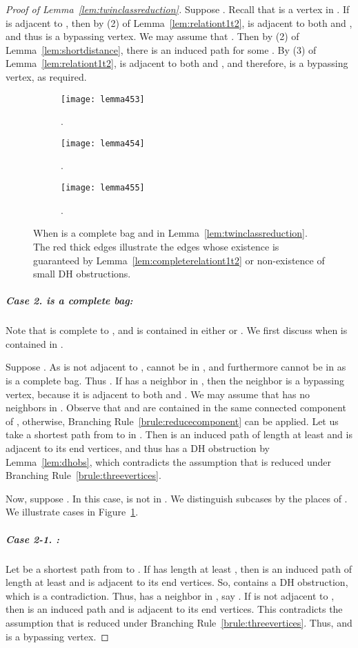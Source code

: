 \documentclass[11pt]{elsarticle}
\begin{document}
\begin{proof}[Proof of Lemma~\ref{lem:twinclassreduction}]
Suppose . Recall that  is a vertex in . If  is adjacent to , then by (2) of Lemma~\ref{lem:relationt1t2},
 is adjacent to both  and , and thus  is a bypassing vertex.
We may assume that .
Then by (2) of Lemma~\ref{lem:shortdistance}, there is an induced path  for some .
By (3) of Lemma~\ref{lem:relationt1t2},  is adjacent to both  and , and therefore,  is a bypassing vertex, as required.


  \begin{figure}[t]
\begin{subfigure}[b]{0.5\textwidth}
      \texttt{[image: lemma453]}
       \caption{.}
\end{subfigure}
\qquad
\begin{subfigure}[b]{0.5\textwidth}
      \texttt{[image: lemma454]}
       \caption{.}
\end{subfigure}
\center
\begin{subfigure}[b]{0.5\textwidth}
      \texttt{[image: lemma455]}
       \caption{.}
\end{subfigure}
            \caption{When  is a complete bag and  in Lemma~\ref{lem:twinclassreduction}.
            The red thick edges illustrate the edges whose existence is guaranteed by Lemma~\ref{lem:completerelationt1t2} or non-existence of small DH obstructions. } \label{fig:lemma45star2}
  \end{figure}

\subparagraph{\textbf{Case 2.}  is a complete bag:}  
Note that  is complete to , and   is contained in either   or .
We first discuss when  is contained in .

Suppose . As  is not adjacent to ,  cannot be in , and furthermore  cannot be in  as  is a complete bag. 
Thus . 
If  has a neighbor in , then the neighbor is a bypassing vertex, because it is adjacent to both  and .
We may assume that  has no neighbors in .
Observe that  and  are contained in the same connected component of , otherwise, Branching Rule~\ref{brule:reducecomponent} can be applied.
Let us take a shortest path  from  to  in .
Then  is an induced path of length at least  and  is adjacent to its end vertices, and thus  has a DH obstruction by Lemma~\ref{lem:dhobs}, which contradicts the assumption that  is reduced under Branching Rule~\ref{brule:threevertices}.

Now, suppose . In this case,  is not in . We distinguish subcases by the places of .
We illustrate cases in Figure~\ref{fig:lemma45star2}.

\subparagraph{\textbf{Case 2-1.}  :}  
Let  be a shortest path from  to .
If  has length at least , then  is an induced path of length at least  and  is adjacent to its end vertices.
So,  contains a DH obstruction, which is a contradiction.
Thus,  has a neighbor in , say .
If  is not adjacent to , then  is an induced path and  is adjacent to its end vertices.
This contradicts the assumption that  is reduced under Branching Rule~\ref{brule:threevertices}.
Thus,  and  is a bypassing vertex.


\end{proof}
\end{document}

